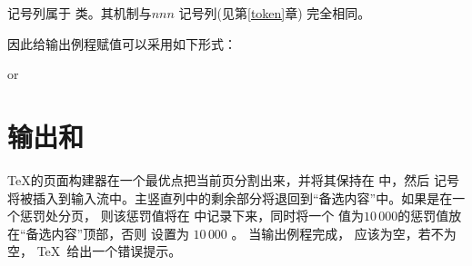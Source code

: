 \documentclass{book}
\begin{document}

 记号列属于  类。其机制与$nnn$ 记号列(见第\ref{token}章) 完全相同。

因此给输出例程赋值可以采用如下形式：

\begin{disp}\quad
or\quad
{}
\end{disp}


\section{输出和 \protect{}}
\label{output255}



\TeX 的页面构建器在一个最优点把当前页分割出来，并将其保持在  中，然后  记号将被插入到输入流中。主竖直列中的剩余部分将退回到“备选内容”中。如果是在一个惩罚处分页，
\alt
则该惩罚值将在  中记录下来，同时将一个 值为$10\,000$的惩罚值放在“备选内容”顶部，否则  设置为 $10\,000$ 。
当输出例程完成，  应该为空，若不为空， \TeX\ 给出一个错误提示。
\end{document}
